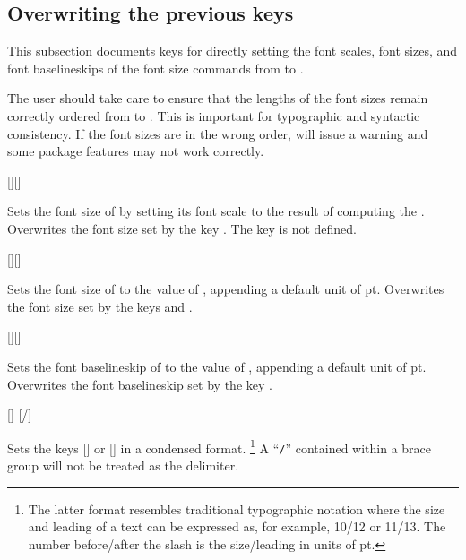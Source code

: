 \documentclass{beery}
\begin{document}
\subsection{Overwriting the previous keys}
\label{subsec:overwriting}

This subsection documents keys for directly setting the font scales, font sizes, and font baselineskips of the font size commands from  to .

The user should take care to ensure that the lengths of the font sizes remain correctly ordered from  to .
This is important for typographic and syntactic consistency.
If the font sizes are in the wrong order,  will issue a warning and some package features may not work correctly.

[][]
\KeepNextPar*

Sets the font size of  by setting its font scale to the result of computing the .
Overwrites the font size set by the key .
The key  is not defined.

[][]
\KeepNextPar*

Sets the font size of  to the value of , appending a default unit of \unit{pt}.
Overwrites the font size set by the keys  and .

[][]
\KeepNextPar*

Sets the font baselineskip of  to the value of , appending a default unit of \unit{pt}.
Overwrites the font baselineskip set by the key .

[]
\nopagebreak\newline
{}[/]

Sets the keys [] or [] in a condensed format.%
\footnote
  {%
    The latter format resembles traditional typographic notation where the size and leading of a text can be expressed as, for example, \num{10}/\num{12} or \num{11}/\num{13}.
    The number before\slash{}after the slash is the size\slash{}leading in units of \unit{pt}.%
  }
A \enquote{\texttt{/}} contained within a brace group will not be treated as the delimiter.
\end{document}
